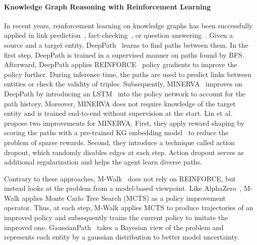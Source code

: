 
\paragraph{Knowledge Graph Reasoning with Reinforcement Learning}

In recent years, reinforcement learning on knowledge graphs has been successfully applied in link prediction~\cite{Das2018Minerva}, fact-checking~\cite{Xiong2017DeePpath}, or question answering~\cite{Qiu2020Stepwise}. Given a source and a target entity, DeepPath~\cite{Xiong2017DeePpath} learns to find paths between them. In the first step, DeepPath is trained in a supervised manner on paths found by BFS. Afterward, DeepPath applies REINFORCE~\cite{Williams1992REINFORCE} policy gradients to improve the policy further.
During inference time, the paths are used to predict links between entities or check the validity of triples. Subsequently, MINERVA~\cite{Das2018Minerva} improves on DeepPath by introducing an LSTM~\cite{Hochreiter1997LSTM} into the policy network to account for the path history. Moreover, MINERVA does not require knowledge of the target entity and is trained end-to-end without supervision at the start. Lin et al.~\cite{Lin2020RewardShaping} propose two improvements for MINERVA. First, they apply reward shaping by scoring the paths with a pre-trained KG embedding model~\cite{Dettmers2018ConvE} to reduce the problem of sparse rewards. Second, they introduce a technique called action dropout, which randomly disables edges at each step. Action dropout serves as additional regularization and helps the agent learn diverse paths.


Contrary to these approaches, M-Walk~\cite{Shen2018MWalk} does not rely on REINFORCE, but instead looks at the problem from a model-based viewpoint. 
Like AlphaZero~\cite{Silver2018AlphaZero}, M-Walk applies Monte Carlo Tree Search (MCTS) as a policy improvement operator. Thus, at each step, M-Walk applies MCTS to produce trajectories of an improved policy and subsequently trains the current policy to imitate the improved one. GaussianPath~\cite{Wan2021GaussianPath} takes a Bayesian view of the problem and represents each entity by a gaussian distribution to better model uncertainty.

